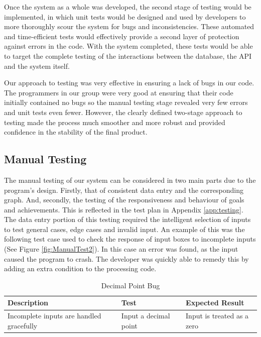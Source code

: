 \documentclass[11pt]{article}
\begin{document}
Once the system as a whole was developed, the second stage of testing would be 
implemented, in which unit tests would be designed and used by developers to 
more thoroughly scour the system for bugs and inconsistencies. These automated 
and time-efficient tests would effectively provide a second layer of protection 
against errors in the code. With the system completed, these tests would be able 
to target the complete testing of the interactions between the database, the API 
and the system itself.\par

Our approach to testing was very effective in ensuring a lack of bugs in our
code. The programmers in our group were very good at ensuring that their code
initially contained no bugs so the manual testing stage revealed very few
errors and unit tests even fewer. However, the clearly defined two-stage
approach to testing made the process much smoother and more robust and provided
confidence in the stability of the final product.\par 

\subsection{Manual Testing} 

The manual testing of our system can be considered in two main parts due to the
program's design. Firstly, that of consistent data entry and the corresponding
graph. And, secondly, the testing of the responsiveness and behaviour of goals
and achievements. This is reflected in the test plan in Appendix
\ref{app:testing}. The data entry portion of this testing required the
intelligent selection of inputs to test general cases, edge cases and invalid
input. An example of this was the following test case used to check the
response of input boxes to incomplete inputs (See Figure
\ref{fig:ManualTest2}). In this case an error was found, as the input caused
the program to crash. The developer was quickly able to remedy this by adding
an extra condition to the processing code.

\begin{table}[!ht]
    \centering
    \begin{tabular}{|p{5cm}|p{5cm}|p{5cm}|}
        \hline
        \textbf{Description} & \textbf{Test} & \textbf{Expected Result} \\
        \hline
        Incomplete inputs are handled gracefully & Input a decimal point & Input is treated as a zero \\
        \hline
    \end{tabular}
    \caption{Decimal Point Bug}
    \label{table:man1}
\end{table}
\end{document}
